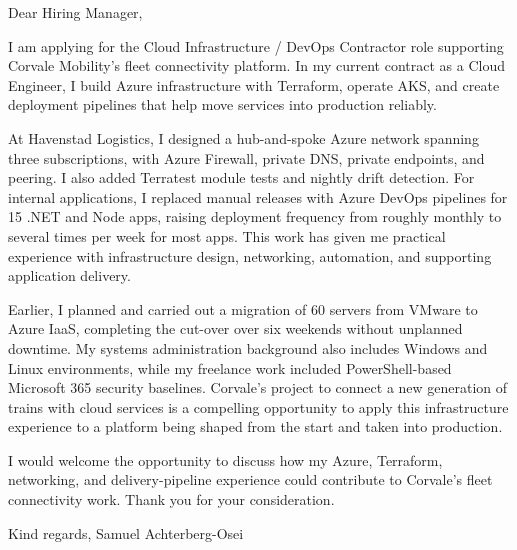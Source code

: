 \documentclass[11pt,a4paper]{article}
\begin{document}
Dear Hiring Manager,

I am applying for the Cloud Infrastructure / DevOps Contractor role supporting Corvale Mobility’s fleet connectivity platform. In my current contract as a Cloud Engineer, I build Azure infrastructure with Terraform, operate AKS, and create deployment pipelines that help move services into production reliably.

At Havenstad Logistics, I designed a hub-and-spoke Azure network spanning three subscriptions, with Azure Firewall, private DNS, private endpoints, and peering. I also added Terratest module tests and nightly drift detection. For internal applications, I replaced manual releases with Azure DevOps pipelines for 15 .NET and Node apps, raising deployment frequency from roughly monthly to several times per week for most apps. This work has given me practical experience with infrastructure design, networking, automation, and supporting application delivery.

Earlier, I planned and carried out a migration of 60 servers from VMware to Azure IaaS, completing the cut-over over six weekends without unplanned downtime. My systems administration background also includes Windows and Linux environments, while my freelance work included PowerShell-based Microsoft 365 security baselines. Corvale’s project to connect a new generation of trains with cloud services is a compelling opportunity to apply this infrastructure experience to a platform being shaped from the start and taken into production.

I would welcome the opportunity to discuss how my Azure, Terraform, networking, and delivery-pipeline experience could contribute to Corvale’s fleet connectivity work. Thank you for your consideration.

Kind regards,
Samuel Achterberg-Osei
\end{document}
